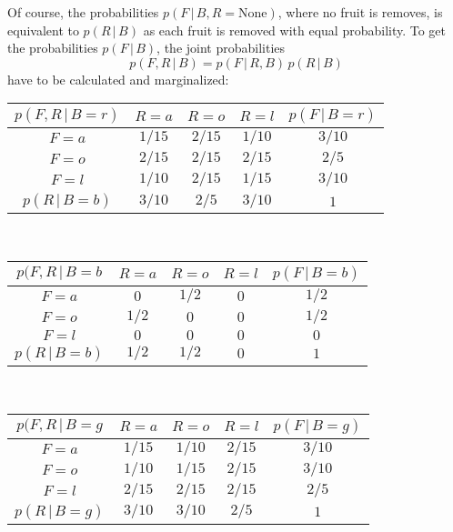 \documentclass[11pt, a4paper]{scrartcl}
\newcommand{\given}{\,\vert\,}
\begin{document}
			Of course, the probabilities \( p(F \given B, R = \text{None}) \), where no fruit is removes, is equivalent to \( p(R \given B) \) as each fruit is removed with equal probability. To get the probabilities \( p(F \given B) \), the joint probabilities
			\begin{equation}
				p(F, R \given B) = p(F \given R, B) \, p(R \given B)
			\end{equation}
			have to be calculated and marginalized:
			\begin{center}
				\begin{tabular}{c|ccc|c}
					\( p(F, R \given B = r) \) & \(R = a\) & \(R = o\) & \(R = l\) & \(p(F \given B = r)\) \\ \hline
					        \(F = a\)          & \(1/15\)  & \(2/15\)  & \(1/10\)  &       \(3/10\)        \\
					        \(F = o\)          & \(2/15\)  & \(2/15\)  & \(2/15\)  &        \(2/5\)        \\
					        \(F = l\)          & \(1/10\)  & \(2/15\)  & \(1/15\)  &       \(3/10\)        \\ \hline
					 \( p(R \given B = b) \)   & \(3/10\)  &  \(2/5\)  & \(3/10\)  &         \(1\)
				\end{tabular} \\
				\vspace{0.5cm}
				\begin{tabular}{c|ccc|c}
					\( p(F, R \given B = b \) & \(R = a\) & \(R = o\) & \(R = l\) & \(p(F \given B = b)\) \\ \hline
					        \(F = a\)         &   \(0\)   &  \(1/2\)  &   \(0\)   &        \(1/2\)        \\
					        \(F = o\)         &  \(1/2\)  &   \(0\)   &   \(0\)   &        \(1/2\)        \\
					        \(F = l\)         &   \(0\)   &   \(0\)   &   \(0\)   &         \(0\)         \\ \hline
					 \( p(R \given B = b) \)  &  \(1/2\)  &  \(1/2\)  &   \(0\)   &         \(1\)
				\end{tabular} \\
				\vspace{0.5cm}
				\begin{tabular}{c|ccc|c}
					\( p(F, R \given B = g \) & \(R = a\) & \(R = o\) & \(R = l\) & \(p(F \given B = g)\) \\ \hline
					        \(F = a\)         & \(1/15\)  & \(1/10\)  & \(2/15\)  &       \(3/10\)        \\
					        \(F = o\)         & \(1/10\)  & \(1/15\)  & \(2/15\)  &       \(3/10\)        \\
					        \(F = l\)         & \(2/15\)  & \(2/15\)  & \(2/15\)  &        \(2/5\)        \\ \hline
					 \( p(R \given B = g) \)  & \(3/10\)  & \(3/10\)  &  \(2/5\)  &         \(1\)
				\end{tabular}
			\end{center}
\end{document}
